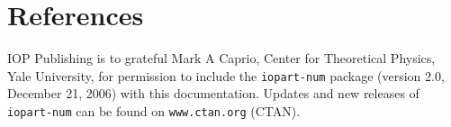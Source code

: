 \documentclass[a4paper]{jpconf}
\begin{document}
\section*{References}
\begin{thebibliography}{9}
 IOP Publishing is to grateful Mark A Caprio, Center for Theoretical Physics, Yale University, for permission to include the {\tt iopart-num} \BibTeX package (version 2.0, December 21, 2006) with  this documentation. Updates and new releases of {\tt iopart-num} can be found on \verb"www.ctan.org" (CTAN). 
\end{thebibliography}
\end{document}
